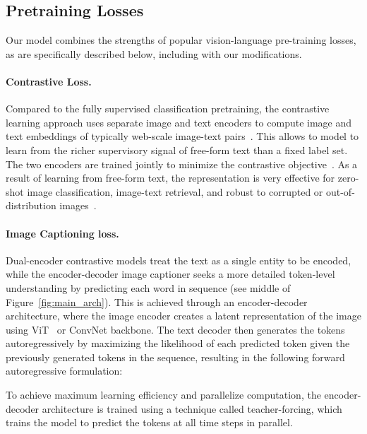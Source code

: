 \documentclass[10pt]{article} \usepackage[accepted]{tmlr}
\begin{document}
\subsection{Pretraining Losses}
Our model combines the strengths of popular vision-language pre-training losses, as are specifically described below, including with our modifications. 


\paragraph{Contrastive Loss.}\quad Compared to the fully supervised classification pretraining, the contrastive learning approach uses separate image and text encoders to compute image and text embeddings of typically web-scale image-text pairs~\citep{radford2021clip,align,yu2022coca,zhai2021lit}. This allows to model to learn from the richer supervisory signal of free-form text than a fixed label set. The two encoders are trained jointly to minimize the contrastive objective~\citep{oord2018representation,radford2021clip,align}.
As a result of learning from free-form text, the representation is very effective for zero-shot image classification, image-text retrieval, and robust to corrupted or out-of-distribution images~\citep{radford2021clip}.

\paragraph{Image Captioning loss.}\quad Dual-encoder contrastive models treat the text as a single entity to be encoded, while the encoder-decoder image captioner seeks a more detailed token-level understanding by predicting each word in sequence (see middle of Figure~\ref{fig:main_arch}). This is achieved through an encoder-decoder architecture, where the image encoder creates a latent representation of the image using ViT~\citep{dosovitskiy2020image} or ConvNet backbone. The text decoder then generates the tokens autoregressively by maximizing the likelihood of each predicted token given the previously generated tokens in the sequence, resulting in the following forward autoregressive formulation:


To achieve maximum learning efficiency and parallelize computation, the encoder-decoder architecture is trained using a technique called teacher-forcing, which trains the model to predict the tokens at all time steps in parallel.
\end{document}
